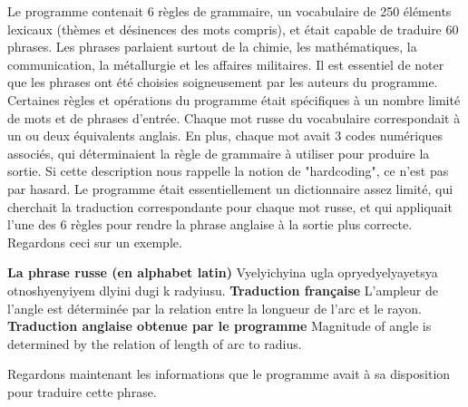 \documentclass[11pt, a4paper]{report}
\begin{document}
Le programme contenait 6 règles de grammaire, un vocabulaire de 250 éléments lexicaux 
(thèmes et désinences des mots compris), et était capable de traduire 60 
phrases. Les phrases parlaient surtout de la chimie, les mathématiques, la 
communication, la métallurgie et les affaires militaires. Il est essentiel de 
noter que les phrases ont été choisies soigneusement par les auteurs du programme. 
Certaines règles et opérations du programme était spécifiques à un nombre limité 
de mots et de phrases d'entrée. Chaque mot russe du vocabulaire correspondait à un ou deux 
équivalents anglais. En plus, chaque mot avait 3 codes numériques associés, qui 
déterminaient la règle de grammaire à utiliser pour produire la sortie. 
Si cette description nous rappelle la notion de 
"hardcoding", ce n'est pas par hasard. Le programme était essentiellement un 
dictionnaire assez limité, qui cherchait la traduction correspondante pour chaque 
mot russe, et qui appliquait l'une des 6 règles pour rendre la phrase anglaise 
à la sortie plus correcte. Regardons ceci sur un exemple. 

\noindent \textbf{La phrase russe (en alphabet latin)} \newline 
Vyelyichyina ugla opryedyelyayetsya otnoshyenyiyem dlyini dugi k radyiusu. \newline  
\textbf{Traduction française} \newline 
L'ampleur de l'angle est déterminée par la relation entre la longueur de l'arc et le rayon. \newline 
\textbf{Traduction anglaise obtenue par le programme} \newline 
Magnitude of angle is determined by the relation of length of arc to radius.

Regardons maintenant les informations que le programme avait à sa disposition pour traduire 
cette phrase. 
\end{document}
